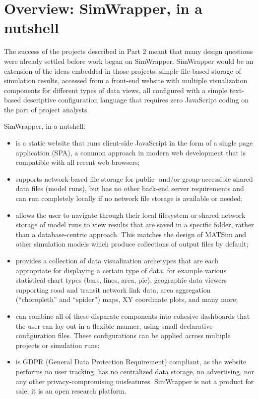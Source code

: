 \hypertarget{simwrapper-overview}{%
\section{Overview: SimWrapper, in a nutshell}
\label{simwrapper-overview}}

The success of the projects described in Part 2 meant that many design questions were already settled before work began on SimWrapper. SimWrapper would be an extension of the ideas embedded in those projects: simple file-based storage of simulation results, accessed from a front-end website with multiple visualization components for different types of data views, all configured with a simple text-based descriptive configuration language that requires zero JavaScript coding on the part of project analysts.

SimWrapper, in a nutshell:

\begin{itemize}
\item
    is a static website that runs client-side JavaScript in the form of
    a single page application (\gls{SPA}), a common approach in modern web
    development that is compatible with all recent web browsers;
\item
    supports network-based file storage for public- and/or
    group-accessible shared data files (model runs), but has no other
    back-end server requirements and can run completely locally if no
    network file storage is available or needed;
\item
    allows the user to navigate through their local filesystem or shared
    network storage of model runs to view results that are saved in a
    specific folder, rather than a database-centric approach. This
    matches the design of MATSim and other simulation models which
    produce collections of output files by default;
\item
    provides a collection of data visualization archetypes that are each
    appropriate for displaying a certain type of data, for example
    various statistical chart types (bars, lines, area, pie), geographic
    data viewers supporting road and transit network link data, area
    aggregation (``choropleth'' and ``spider'') maps, XY coordinate
    plots, and many more;
\item
    can combine all of these disparate components into cohesive
    dashboards that the user can lay out in a flexible manner, using
    small declarative configuration files. These configurations can be
    applied across multiple projects or simulation runs;
\item
    is GDPR (General Data Protection Requirement) compliant,
    as the website performs no user tracking, has no centralized data storage,
    no advertising, nor any other privacy-compromising misfeatures.
    SimWrapper is not a product for sale; it is an open research platform.
\end{itemize}

